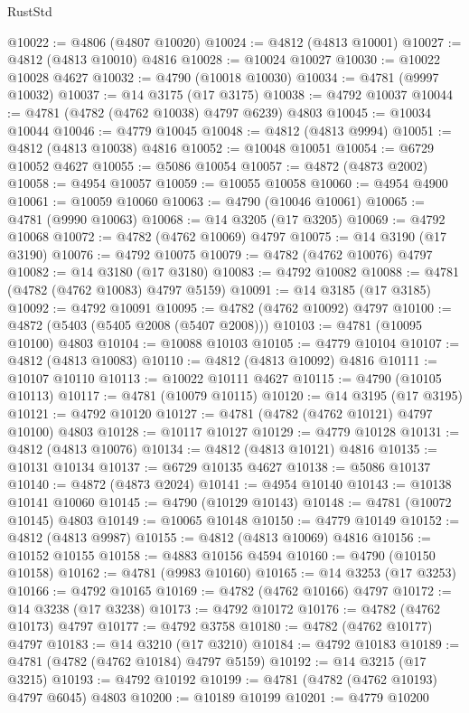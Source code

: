 \begin{lexlean}{RustStd}
\begin{coremodule}
@10022 := @4806 (@4807 @10020)
@10024 := @4812 (@4813 @10001)
@10027 := @4812 (@4813 @10010) @4816
@10028 := @10024 @10027
@10030 := @10022 @10028 @4627
@10032 := @4790 (@10018 @10030)
@10034 := @4781 (@9997 @10032)
@10037 := @14 @3175 (@17 @3175)
@10038 := @4792 @10037
@10044 := @4781 (@4782 (@4762 @10038) @4797 @6239) @4803
@10045 := @10034 @10044
@10046 := @4779 @10045
@10048 := @4812 (@4813 @9994)
@10051 := @4812 (@4813 @10038) @4816
@10052 := @10048 @10051
@10054 := @6729 @10052 @4627
@10055 := @5086 @10054
@10057 := @4872 (@4873 @2002)
@10058 := @4954 @10057
@10059 := @10055 @10058
@10060 := @4954 @4900
@10061 := @10059 @10060
@10063 := @4790 (@10046 @10061)
@10065 := @4781 (@9990 @10063)
@10068 := @14 @3205 (@17 @3205)
@10069 := @4792 @10068
@10072 := @4782 (@4762 @10069) @4797
@10075 := @14 @3190 (@17 @3190)
@10076 := @4792 @10075
@10079 := @4782 (@4762 @10076) @4797
@10082 := @14 @3180 (@17 @3180)
@10083 := @4792 @10082
@10088 := @4781 (@4782 (@4762 @10083) @4797 @5159)
@10091 := @14 @3185 (@17 @3185)
@10092 := @4792 @10091
@10095 := @4782 (@4762 @10092) @4797
@10100 := @4872 (@5403 (@5405 @2008 (@5407 @2008)))
@10103 := @4781 (@10095 @10100) @4803
@10104 := @10088 @10103
@10105 := @4779 @10104
@10107 := @4812 (@4813 @10083)
@10110 := @4812 (@4813 @10092) @4816
@10111 := @10107 @10110
@10113 := @10022 @10111 @4627
@10115 := @4790 (@10105 @10113)
@10117 := @4781 (@10079 @10115)
@10120 := @14 @3195 (@17 @3195)
@10121 := @4792 @10120
@10127 := @4781 (@4782 (@4762 @10121) @4797 @10100) @4803
@10128 := @10117 @10127
@10129 := @4779 @10128
@10131 := @4812 (@4813 @10076)
@10134 := @4812 (@4813 @10121) @4816
@10135 := @10131 @10134
@10137 := @6729 @10135 @4627
@10138 := @5086 @10137
@10140 := @4872 (@4873 @2024)
@10141 := @4954 @10140
@10143 := @10138 @10141 @10060
@10145 := @4790 (@10129 @10143)
@10148 := @4781 (@10072 @10145) @4803
@10149 := @10065 @10148
@10150 := @4779 @10149
@10152 := @4812 (@4813 @9987)
@10155 := @4812 (@4813 @10069) @4816
@10156 := @10152 @10155
@10158 := @4883 @10156 @4594
@10160 := @4790 (@10150 @10158)
@10162 := @4781 (@9983 @10160)
@10165 := @14 @3253 (@17 @3253)
@10166 := @4792 @10165
@10169 := @4782 (@4762 @10166) @4797
@10172 := @14 @3238 (@17 @3238)
@10173 := @4792 @10172
@10176 := @4782 (@4762 @10173) @4797
@10177 := @4792 @3758
@10180 := @4782 (@4762 @10177) @4797
@10183 := @14 @3210 (@17 @3210)
@10184 := @4792 @10183
@10189 := @4781 (@4782 (@4762 @10184) @4797 @5159)
@10192 := @14 @3215 (@17 @3215)
@10193 := @4792 @10192
@10199 := @4781 (@4782 (@4762 @10193) @4797 @6045) @4803
@10200 := @10189 @10199
@10201 := @4779 @10200

\end{coremodule}
\end{lexlean}
